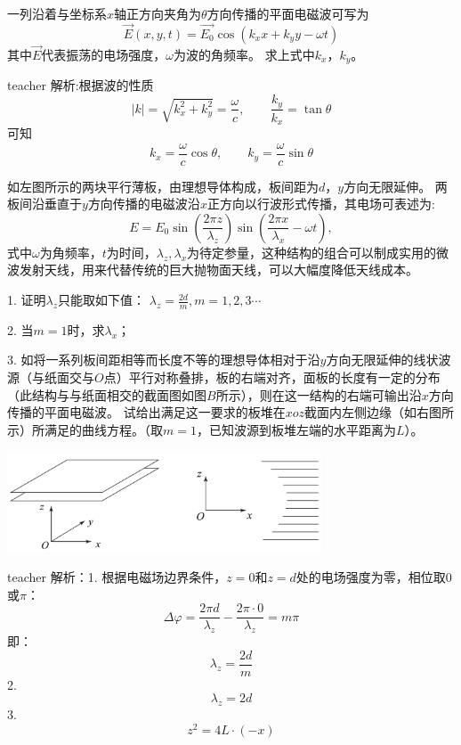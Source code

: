 \begin{example}
一列沿着与坐标系$x$轴正方向夹角为$\theta$方向传播的平面电磁波可写为
\[\vec{E}(x,y,t) = \vec{E_0}\cos(k_xx+k_yy-\omega t)\]
其中$\vec{E}$代表振荡的电场强度，$\omega$为波的角频率。
求上式中$k_x$，$k_y$。
\begin{taggedblock}{teacher}
\noindent
解析:根据波的性质
\[
|k| = \sqrt{k_x^2+k_y^2} = \frac{\omega}{c},\qquad \frac{k_y}{k_x} = \tan\theta
\]
可知
\[
k_x = \frac{\omega}{c}\cos\theta,\qquad k_y = \frac{\omega}{c}\sin\theta
\]
\end{taggedblock}
\end{example}



\begin{example}
如左图所示的两块平行薄板，由理想导体构成，板间距为$d$，$y$方向无限延伸。
两板间沿垂直于$y$方向传播的电磁波沿$x$正方向以行波形式传播，其电场可表述为:
\[
E = E_0\sin(\frac{2\pi z}{\lambda_z})\sin(\frac{2\pi x}{\lambda_x}-\omega t),
\]
式中$\omega$为角频率，$t$为时间，$\lambda_z,\lambda_x$为待定参量，这种结构的组合可以制成实用的微波发射天线，用来代替传统的巨大抛物面天线，可以大幅度降低天线成本。

1. 证明$\lambda_z$只能取如下值： $\lambda_z = \frac{2d}{m},m=1,2,3\cdots$

2. 当$m=1$时，求$\lambda_x$；

3. 如将一系列板间距相等而长度不等的理想导体相对于沿$y$方向无限延伸的线状波源（与纸面交与$O$点）平行对称叠排，板的右端对齐，面板的长度有一定的分布（此结构与与纸面相交的截面图如图$B$所示），则在这一结构的右端可输出沿$x$方向传播的平面电磁波。
试给出满足这一要求的板堆在$xoz$截面内左侧边缘（如右图所示）所满足的曲线方程。（取$m=1$，已知波源到板堆左端的水平距离为$L$）。
\begin{center}
\includegraphics[width = 0.7\textwidth]{images/em-theory-6.pdf} 
\end{center}

\begin{taggedblock}{teacher}
\noindent
解析：1. 根据电磁场边界条件，$z=0$和$z=d$处的电场强度为零，相位取$0$或$\pi$：
\[\Delta \varphi = \frac{2\pi d}{\lambda_z}-\frac{2\pi \cdot 0}{\lambda_z}=m\pi\]
即：
\[\lambda_z=\frac{2d}{m}\]
2. \[\lambda_z=2d\]
3. \[z^2 = 4L \cdot (-x)\]
\end{taggedblock}
\end{example}

